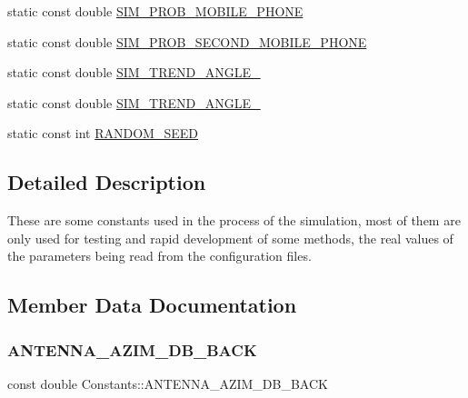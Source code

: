 \begin{DoxyCompactItemize}
\item 
static const double \mbox{\hyperlink{class_constants_a8af75c6e731c2f425cce792b33786db7}{S\+I\+M\+\_\+\+P\+R\+O\+B\+\_\+\+M\+O\+B\+I\+L\+E\+\_\+\+P\+H\+O\+NE}}
\item 
static const double \mbox{\hyperlink{class_constants_aafd39df52173dca1074d8c92aa5f9649}{S\+I\+M\+\_\+\+P\+R\+O\+B\+\_\+\+S\+E\+C\+O\+N\+D\+\_\+\+M\+O\+B\+I\+L\+E\+\_\+\+P\+H\+O\+NE}}
\item 
static const double \mbox{\hyperlink{class_constants_a97968377c9a3cf2995c37aa63d3dd505}{S\+I\+M\+\_\+\+T\+R\+E\+N\+D\+\_\+\+A\+N\+G\+L\+E\+\_}}
\item 
static const double \mbox{\hyperlink{class_constants_a1ec9cdffb9c58a2ff1cb60f64b056835}{S\+I\+M\+\_\+\+T\+R\+E\+N\+D\+\_\+\+A\+N\+G\+L\+E\+\_}}
\item 
static const int \mbox{\hyperlink{class_constants_ac80eccfaa8e498ad3fc6ea0a2c3d38a0}{R\+A\+N\+D\+O\+M\+\_\+\+S\+E\+ED}}
\end{DoxyCompactItemize}


\subsection{Detailed Description}
These are some constants used in the process of the simulation, most of them are only used for testing and rapid development of some methods, the real values of the parameters being read from the configuration files. 

\subsection{Member Data Documentation}
\mbox{\label{class_constants_aa2030f2c0ec89fb7cc06b31bbb50793d}} 
\subsubsection{\texorpdfstring{ANTENNA\_AZIM\_DB\_BACK}{ANTENNA\_AZIM\_DB\_BACK}}
{\footnotesize\ttfamily const double Constants\+::\+A\+N\+T\+E\+N\+N\+A\+\_\+\+A\+Z\+I\+M\+\_\+\+D\+B\+\_\+\+B\+A\+CK\hspace{0.3cm}{\ttfamily [static]}}

\mbox{\label{class_constants_a4e4a0a48ad06c458ae4f3e6d0e4e6608}} 
